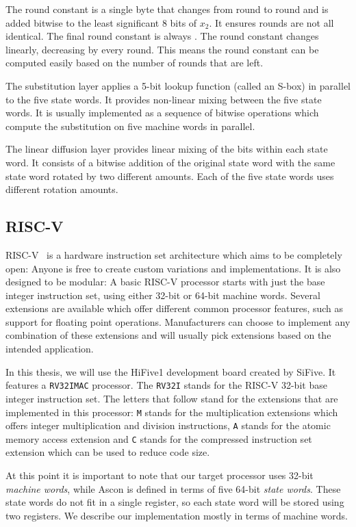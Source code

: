 The round constant is a single byte that changes from round to round and is
added bitwise to the least significant 8 bits of $x_2$. It ensures rounds are
not all identical. The final round constant is always . The round
constant changes linearly, decreasing by  every round. This means
the round constant can be computed easily based on the number of rounds that are
left.

The substitution layer applies a 5-bit lookup function (called an S-box) in
parallel to the five state words. It provides non-linear mixing between the five
state words. It is usually implemented as a sequence of bitwise operations which
compute the substitution on five machine words in parallel.

The linear diffusion layer provides linear mixing of the bits within each state
word. It consists of a bitwise addition of the original state word with the same
state word rotated by two different amounts. Each of the five state words uses
different rotation amounts.

\subsection{RISC-V} RISC-V~\cite{riscv} is a hardware instruction set
architecture which aims to be completely open: Anyone is free to create custom
variations and implementations. It is also designed to be modular: A basic
RISC-V processor starts with just the base integer instruction set, using either
32-bit or 64-bit machine words. Several extensions are available which offer
different common processor features, such as support for floating point
operations. Manufacturers can choose to implement any combination of these
extensions and will usually pick extensions based on the intended application.

In this thesis, we will use the HiFive1 development board created by SiFive. It
features a \texttt{RV32IMAC} processor. The \texttt{RV32I} stands for the RISC-V
32-bit base integer instruction set. The letters that follow stand for the
extensions that are implemented in this processor: \texttt{M} stands for the
multiplication extensions which offers integer multiplication and division
instructions, \texttt{A} stands for the atomic memory access extension and
\texttt{C} stands for the compressed instruction set extension which can be used
to reduce code size.

At this point it is important to note that our target processor uses 32-bit
\emph{machine words}, while Ascon is defined in terms of five 64-bit
\emph{state words}. These state words do not fit in a single register, so each
state word will be stored using two registers. We describe our implementation
mostly in terms of machine words.

